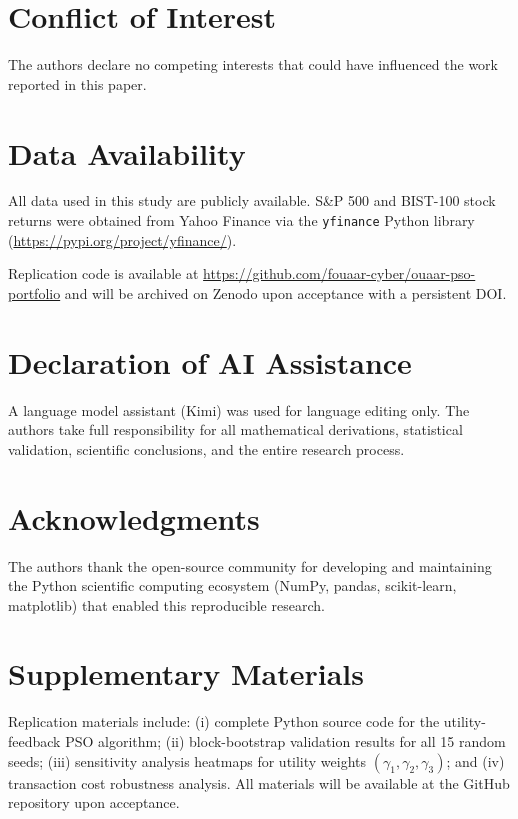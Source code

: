 \documentclass[12pt,a4paper]{article}
\begin{document}
	\section*{Conflict of Interest}
	
	The authors declare no competing interests that could have influenced the work reported in this paper.
	
	\section*{Data Availability}
	
	All data used in this study are publicly available. S\&P 500 and BIST-100 stock returns were obtained from Yahoo Finance via the \texttt{yfinance} Python library (\url{https://pypi.org/project/yfinance/}). 
	
	Replication code is available at \url{https://github.com/fouaar-cyber/ouaar-pso-portfolio} and will be archived on Zenodo upon acceptance with a persistent DOI.
	
	\section*{Declaration of AI Assistance}
	
	A language model assistant (Kimi) was used for language editing only. The authors take full responsibility for all mathematical derivations, statistical validation, scientific conclusions, and the entire research process.
	\section*{Acknowledgments}
	
	The authors thank the open-source community for developing and maintaining the Python scientific computing ecosystem (NumPy, pandas, scikit-learn, matplotlib) that enabled this reproducible research.
	
	\section*{Supplementary Materials}
	
	Replication materials include: (i) complete Python source code for the utility-feedback PSO algorithm; (ii) block-bootstrap validation results for all 15 random seeds; (iii) sensitivity analysis heatmaps for utility weights $(\gamma_1, \gamma_2, \gamma_3)$; and (iv) transaction cost robustness analysis. All materials will be available at the GitHub repository upon acceptance.
	
\end{document}
